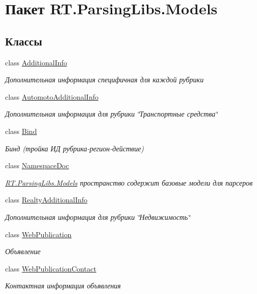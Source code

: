\hypertarget{namespace_r_t_1_1_parsing_libs_1_1_models}{\section{Пакет R\+T.\+Parsing\+Libs.\+Models}
\label{namespace_r_t_1_1_parsing_libs_1_1_models}
}
\subsection*{Классы}
\begin{DoxyCompactItemize}
\item 
class \hyperlink{class_r_t_1_1_parsing_libs_1_1_models_1_1_additional_info}{Additional\+Info}
\begin{DoxyCompactList}\small\item\em Дополнительная информация специфичная для каждой рубрики \end{DoxyCompactList}\item 
class \hyperlink{class_r_t_1_1_parsing_libs_1_1_models_1_1_automoto_additional_info}{Automoto\+Additional\+Info}
\begin{DoxyCompactList}\small\item\em Дополнительная информация для рубрики \char`\"{}Транспортные средства\char`\"{} \end{DoxyCompactList}\item 
class \hyperlink{class_r_t_1_1_parsing_libs_1_1_models_1_1_bind}{Bind}
\begin{DoxyCompactList}\small\item\em Бинд (тройка ИД рубрика-\/регион-\/действие) \end{DoxyCompactList}\item 
class \hyperlink{class_r_t_1_1_parsing_libs_1_1_models_1_1_namespace_doc}{Namespace\+Doc}
\begin{DoxyCompactList}\small\item\em \hyperlink{namespace_r_t_1_1_parsing_libs_1_1_models}{R\+T.\+Parsing\+Libs.\+Models} пространство содержит базовые модели для парсеров \end{DoxyCompactList}\item 
class \hyperlink{class_r_t_1_1_parsing_libs_1_1_models_1_1_realty_additional_info}{Realty\+Additional\+Info}
\begin{DoxyCompactList}\small\item\em Дополнительная информация для рубрики \char`\"{}Недвижимость\char`\"{} \end{DoxyCompactList}\item 
class \hyperlink{class_r_t_1_1_parsing_libs_1_1_models_1_1_web_publication}{Web\+Publication}
\begin{DoxyCompactList}\small\item\em Объявление \end{DoxyCompactList}\item 
class \hyperlink{class_r_t_1_1_parsing_libs_1_1_models_1_1_web_publication_contact}{Web\+Publication\+Contact}
\begin{DoxyCompactList}\small\item\em Контактная информация объявления \end{DoxyCompactList}\end{DoxyCompactItemize}
